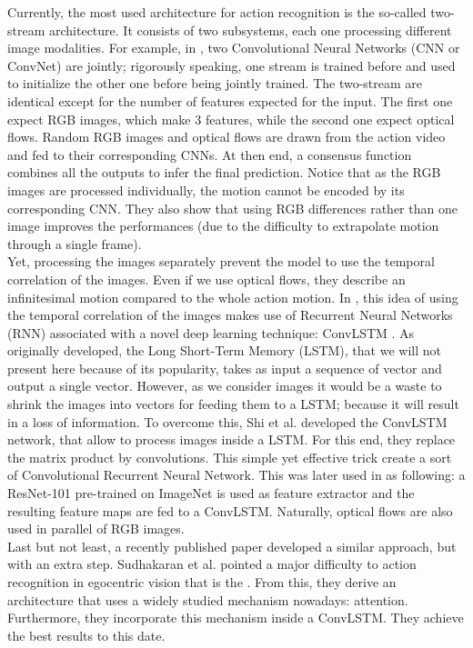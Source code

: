 \documentclass[12pt, a4paper]{report}
\begin{document}
	Currently, the most used architecture for action recognition is the so-called two-stream architecture.
	It consists of two subsystems, each one processing different image modalities.
	For example, in \cite{wang}, two Convolutional Neural Networks (CNN or ConvNet) are \gls{jointly}; rigorously speaking, one stream is trained before and used to initialize the other one before being jointly trained.
	The two-stream are identical except for the number of features expected for the input.
	The first one expect RGB images, which make 3 features, while the second one expect optical flows.
	Random RGB images and optical flows are drawn from the action video and fed to their corresponding CNNs.
	At then end, a consensus function combines all the outputs to infer the final prediction.
	Notice that as the RGB images are processed individually, the motion cannot be encoded by its corresponding CNN.
	They also show that using RGB differences rather than one image improves the performances (due to the difficulty to extrapolate motion through a single frame).\\
	Yet, processing the images separately prevent the model to use the temporal correlation of the images.
	Even if we use optical flows, they describe an infinitesimal motion compared to the whole action motion.
	In \cite{ye}, this idea of using the temporal correlation of the images makes use of Recurrent Neural Networks (RNN) associated with a novel deep learning technique: ConvLSTM \cite{shi}.
	As originally developed, the Long Short-Term Memory (LSTM), that we will not present here because of its popularity, takes as input a sequence of vector and output a single vector.
	However, as we consider images it would be a waste to shrink the images into vectors for feeding them to a LSTM; because it will result in a loss of information.
	To overcome this, Shi et al. developed the ConvLSTM network, that allow to process images inside a LSTM.
	For this end, they replace the matrix product by convolutions.
	This simple yet effective trick create a sort of Convolutional Recurrent Neural Network.
	This was later used in \cite{ye} as following: a ResNet-101 pre-trained on ImageNet is used as feature extractor and the resulting feature maps are fed to a ConvLSTM.
	Naturally, optical flows are also used in parallel of RGB images.\\

	Last but not least, a recently published paper developed a similar approach, but with an extra step.
	Sudhakaran et al. \cite{sudhakaran} pointed a major difficulty to action recognition in egocentric vision that is the .
	From this, they derive an architecture that uses a widely studied mechanism nowadays: attention.
	Furthermore, they incorporate this mechanism inside a ConvLSTM.  %
	They achieve the best results to this date.
\end{document}
